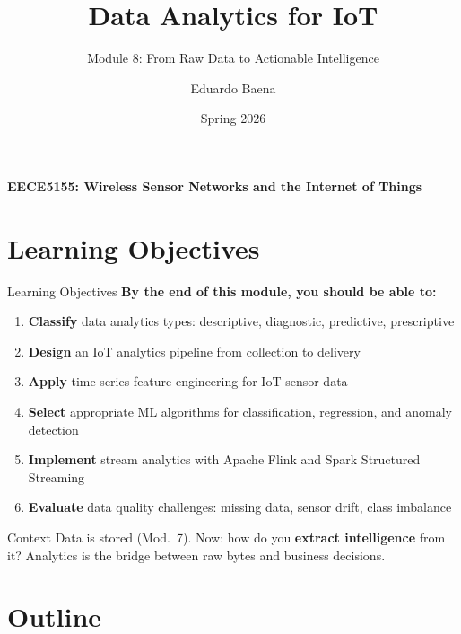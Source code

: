 \documentclass[aspectratio=169,11pt]{beamer}
\title[EECE5155 -- Module 8]{Data Analytics for IoT}
\subtitle{Module 8: From Raw Data to Actionable Intelligence}
\author{Eduardo Baena}
\date{Spring 2026}
\institute{Northeastern University\\Department of Electrical and Computer Engineering\\
\texttt{e.baena@northeastern.edu}}
\begin{document}
\begin{frame}
    \titlepage
    \vspace{-1cm}
    \begin{center}
        \textbf{EECE5155: Wireless Sensor Networks and the Internet of Things}
    \end{center}
\end{frame}

\section{Learning Objectives}

\begin{frame}{Learning Objectives}
    \textbf{By the end of this module, you should be able to:}

    \vspace{0.2cm}
    \begin{enumerate}
        \item \textbf{Classify} data analytics types: descriptive, diagnostic, predictive, prescriptive
        \item \textbf{Design} an IoT analytics pipeline from collection to delivery
        \item \textbf{Apply} time-series feature engineering for IoT sensor data
        \item \textbf{Select} appropriate ML algorithms for classification, regression, and anomaly detection
        \item \textbf{Implement} stream analytics with Apache Flink and Spark Structured Streaming
        \item \textbf{Evaluate} data quality challenges: missing data, sensor drift, class imbalance
    \end{enumerate}

    \vspace{0.1cm}
    \begin{alertblock}{Context}
        Data is stored (Mod.~7). Now: how do you \textbf{extract intelligence} from it? Analytics is the bridge between raw bytes and business decisions.
    \end{alertblock}
\end{frame}

\section{Outline}
\end{document}
